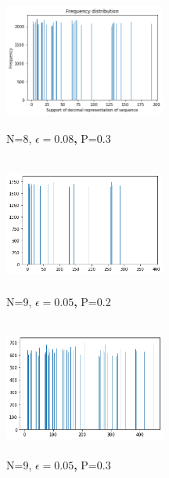 \documentclass[11pt]{article}
\begin{document}
\begin{center}
        \begin{figure}[!h]
        \centering
          \includegraphics[width=200, height=45mm]{3.png}
          \caption{N=8, \textbf{\(\epsilon=0.08\),} P=0.3}
          \label{fig:Piston}
        \end{figure}
\end{center}

\begin{center}
        \begin{figure}[!h]
        \centering
          \includegraphics[width=200, height=45mm]{5.png}
          \caption{N=9, \textbf{\(\epsilon=0.05\),} P=0.2}
          \label{fig:Piston}
        \end{figure}
\end{center}

\begin{center}
        \begin{figure}[!h]
        \centering
          \includegraphics[width=200, height=45mm]{6.png}
          \caption{N=9, \textbf{\(\epsilon=0.05\),} P=0.3}
          \label{fig:Piston}
        \end{figure}
\end{center}
\end{document}
